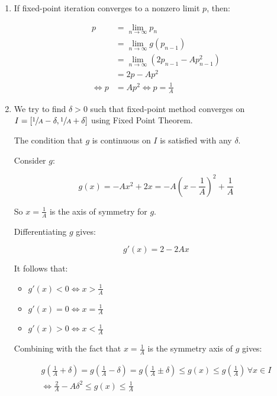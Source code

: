 \documentclass[../../../../Assignments]{subfiles}
\begin{document}
\begin{solution}
    \begin{enumerate}[label = \alph*)]
        \item If fixed-point iteration converges to a nonzero limit \(p\), then:

            \begin{align*}
                     p &= \lim_{n \to \infty} p_n \\
                       &= \lim_{n \to \infty} g(p_{n - 1}) \\
                       &= \lim_{n \to \infty} \left(2p_{n - 1} - Ap_{n - 1}^2\right) \\
                       &= 2p - Ap^2 \\
                \iff p &= Ap^2 \iff  p = \frac{1}{A}
            \end{align*}

        \item We try to find \(\delta > 0\) such that fixed-point method
            converges on \(I = \interval{\sfrac{1}{A} - \delta}{\sfrac{1}{A} +
            \delta}\) using Fixed Point Theorem.

            The condition that \(g\) is continuous on \(I\) is satisfied with
            any \(\delta\).

            Consider \(g\):

            \[g(x) = -Ax^2 + 2x = -A \left(x - \frac{1}{A}\right)^2 + \frac{1}{A}\]

            So \(x = \frac{1}{A}\) is the axis of symmetry for \(g\).

            Differentiating \(g\) gives:

            \[g'(x) = 2 - 2Ax\]

            It follows that:

            \begin{itemize}
                \item \(g'(x) < 0 \iff x > \frac{1}{A}\)
                \item \(g'(x) = 0 \iff x = \frac{1}{A}\)
                \item \(g'(x) > 0 \iff x < \frac{1}{A}\)
            \end{itemize}

            Combining with the fact that \(x = \frac{1}{A}\) is the symmetry
            axis of \(g\) gives:

            \begin{gather*}
                g \left(\frac{1}{A} + \delta\right) = g \left(\frac{1}{A} - \delta\right) = g \left(\frac{1}{A} \pm \delta\right) \leq g(x) \leq g \left(\frac{1}{A}\right) \, \forall x \in I \\
                \iff \frac{2}{A} - A \delta^2 \leq g(x) \leq \frac{1}{A}
            \end{gather*}


\end{enumerate}
\end{solution}
\end{document}
